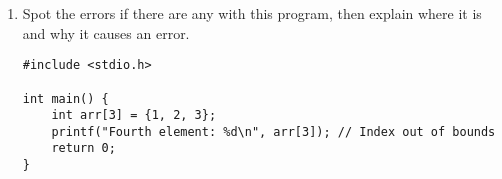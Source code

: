 \documentclass[a4paper,12pt]{article}
\begin{document}
\begin{enumerate}
\begin{lstlisting}
#include <stdio.h>

int main() {
    int i = 0;
    while (i < 5) {
        printf("Iteration %d\n", i);
    }
    return 0;
}\end{lstlisting}

    \item Spot the errors if there are any with this program, then explain where it is and why it causes an error.

\begin{lstlisting}
#include <stdio.h>

int main() {
    int arr[3] = {1, 2, 3};
    printf("Fourth element: %d\n", arr[3]); // Index out of bounds
    return 0;
}\end{lstlisting}

\end{enumerate}

\hrulefill
\end{document}
